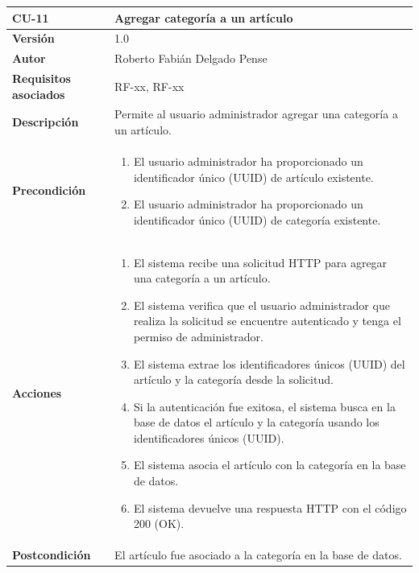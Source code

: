 \begin{table}[p]
	\centering
	\begin{tabularx}{\linewidth}{ p{} p{} }
		\toprule
		\textbf{CU-11}    & \textbf{Agregar categoría a un artículo}\\
		\toprule
		\textbf{Versión}              & 1.0    \\
		\textbf{Autor}                & Roberto Fabián Delgado Pense \\
		\textbf{Requisitos asociados} & RF-xx, RF-xx \\ 
		\textbf{Descripción}          & Permite al usuario administrador agregar una categoría a un artículo. \\
		\textbf{Precondición}         & 
  		\begin{enumerate}
			\def\labelenumi{\arabic{enumi}.}
			\tightlist
			\item El usuario administrador ha proporcionado un identificador único (UUID) de artículo existente.
			\item El usuario administrador ha proporcionado un identificador único (UUID) de categoría existente.
            \end{enumerate}\\
		\textbf{Acciones}             &
		\begin{enumerate}
			\def\labelenumi{\arabic{enumi}.}
			\tightlist
			\item El sistema recibe una solicitud HTTP para agregar una categoría a un artículo.
                \item El sistema verifica que el usuario administrador que realiza la solicitud se encuentre autenticado y tenga el permiso de administrador.
			\item El sistema extrae los identificadores únicos (UUID) del artículo y la categoría desde la                  solicitud.
                \item Si la autenticación fue exitosa, el sistema busca en la base de datos el artículo y la categoría usando los identificadores únicos (UUID).
                \item El sistema asocia el artículo con la categoría en la base de datos.
                \item El sistema devuelve una respuesta HTTP con el código 200 (OK).
            \end{enumerate}\\
		\textbf{Postcondición}        & El artículo fue asociado a la categoría en la base de datos.\\

\end{tabularx}
\end{table}
